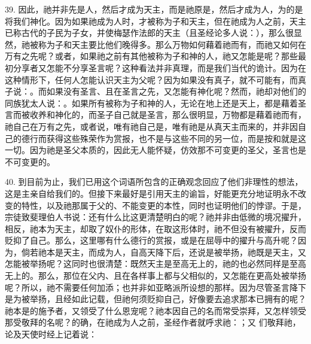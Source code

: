 39. 因此，祂并非先是人，然后才成为天主，而是祂原是，然后才成为人，为的是将我们神化。因为如果祂成为人时，才被称为子和天主，但在祂成为人之前，天主已称古代的子民为子女，并使梅瑟作法郎的天主（且圣经论多人说：），那么很显然，祂被称为子和天主要比他们晚得多。那么万物如何藉着祂而有，而祂又如何在万有之先呢？或者，如果祂之前有其他被称为子和神的人，祂又怎能是呢？那些最初分享者又怎能不分享圣言呢？这种看法并非真理，而是我们当代的诡计。因为在这种情形下，任何人怎能认识天主为父呢？因为如果没有真子，就不可能有，而真子说：。而如果没有圣言、且在圣言之先，又怎能有神化呢？然而，祂却对他们的同族犹太人说：。如果所有被称为子和神的人，无论在地上还是天上，都是藉着圣言而被收养和神化的，而圣子自己就是圣言，那么很明显，万物都是藉着祂而有，祂自己在万有之先，或者说，唯有祂自己是，唯有祂是从真天主而来的，并非因自己的德行而获得这些殊荣作为赏报，也不是与这些不同的另一位，而是按和就是这一切。因为祂是圣父本质的，因此无人能怀疑，仿效那不可变更的圣父，圣言也是不可变更的。\par

40. 到目前为止，我们已用这个词语所包含的正确观念回应了他们非理性的想法，这是主亲自给我们的。但接下来最好是引用天主的谕旨，好能更充分地证明永不改变的特性，以及祂那属于父的、不能变更的本性，同时也证明他们的悖谬。于是，宗徒致斐理伯人书说：还有什么比这更清楚明白的呢？祂并非由低微的境况擢升，相反，祂本为天主，却取了奴仆的形体，在取这形体时，祂不但没有被擢升，反而贬抑了自己。那么，这里哪有什么德行的赏报，或是在屈辱中的擢升与高升呢？因为，倘若祂本是天主，而成为人，自高天降下后，还说是被举扬，祂既是天主，又怎能被举扬呢？这同时也很清楚：既然天主是至高无上的，祂的也必然同样是至高无上的。那么，那位在父内、且在各样事上都与父相似的，又怎能在更高处被举扬呢？所以，祂不需要任何加添；也并非如亚略派所设想的那样。因为尽管圣言降下是为被举扬，且经如此记载，但祂何须贬抑自己，好像要去追求那本已拥有的呢？祂本是的施予者，又领受了什么恩宠呢？祂本因自己的名而常受崇拜，又怎样领受那受敬拜的名呢？的确，在祂成为人之前，圣经作者就呼求祂：；又 们敬拜祂，论及天使时经上记着说：\par

